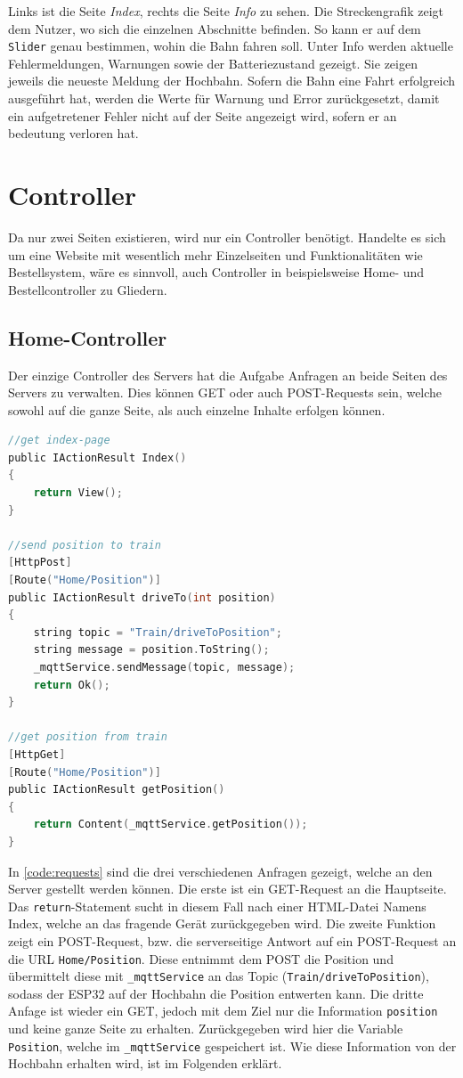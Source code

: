 Links ist die Seite \textit{Index}, rechts die Seite \textit{Info} zu sehen. Die Streckengrafik zeigt dem Nutzer, wo sich die einzelnen Abschnitte befinden. So kann er auf dem \texttt{Slider} genau bestimmen, wohin die Bahn fahren soll. Unter Info werden aktuelle Fehlermeldungen, Warnungen sowie der Batteriezustand gezeigt. Sie zeigen jeweils die neueste Meldung der Hochbahn. Sofern die Bahn eine Fahrt erfolgreich ausgeführt hat, werden die Werte für Warnung und Error zurückgesetzt, damit ein aufgetretener Fehler nicht auf der Seite angezeigt wird, sofern er an bedeutung verloren hat. 
\newpage
\section{Controller}
\label{sec:controller}
Da nur zwei Seiten existieren, wird nur ein Controller benötigt. Handelte es sich um eine Website mit wesentlich mehr Einzelseiten und Funktionalitäten wie Bestellsystem, wäre es sinnvoll, auch Controller in beispielsweise Home- und Bestellcontroller zu Gliedern. \\

\subsection{Home-Controller}
Der einzige Controller des Servers hat die Aufgabe Anfragen an beide Seiten des Servers zu verwalten. Dies können GET oder auch POST-Requests sein, welche sowohl auf die ganze Seite, als auch einzelne Inhalte erfolgen können.
\newpage
\begin{lstlisting}[language=c, style=dhpaperdefault]
//get index-page
public IActionResult Index()
{
	return View();
}

//send position to train
[HttpPost]
[Route("Home/Position")]
public IActionResult driveTo(int position)
{
	string topic = "Train/driveToPosition";
	string message = position.ToString();
	_mqttService.sendMessage(topic, message);
	return Ok();
}

//get position from train
[HttpGet]
[Route("Home/Position")]
public IActionResult getPosition()
{
	return Content(_mqttService.getPosition());
}
\end{lstlisting}
\vspace{0.5cm}

In \autoref{code:requests} sind die drei verschiedenen Anfragen gezeigt, welche an den Server gestellt werden können. Die erste ist ein GET-Request an die Hauptseite. Das \texttt{return}-Statement sucht in diesem Fall nach einer HTML-Datei Namens Index, welche an das fragende Gerät zurückgegeben wird. Die zweite Funktion zeigt ein POST-Request, bzw. die serverseitige Antwort auf ein POST-Request an die URL \texttt{Home/Position}. Diese entnimmt dem POST die Position und übermittelt diese mit \texttt{\_mqttService} an das Topic (\texttt{Train/driveToPosition}), sodass der ESP32 auf der Hochbahn die Position entwerten kann. Die dritte Anfage ist wieder ein GET, jedoch mit dem Ziel nur die Information \texttt{position} und keine ganze Seite zu erhalten. Zurückgegeben wird hier die Variable \texttt{Position}, welche im \texttt{\_mqttService} gespeichert ist. Wie diese Information von der Hochbahn erhalten wird, ist im Folgenden erklärt.
